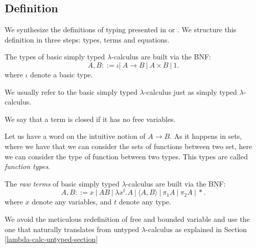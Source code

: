\subsection{Definition}

We synthesize the definitions of typing presented in \cite{lambek1988introduction} or \cite{selinger2008lecture}. We structure this definition in three steps: types, terms  and equations.


\begin{definition}
  The types of basic simply typed $\lambda$-calculus are built via the BNF:
  $$A,B ::= \iota |\ A\to B\ |\ A \times B  \ |\ 1.$$
  where $\iota$ denote a basic type. 
\end{definition}
\begin{remark}
  We usually refer to the basic simply typed $\lambda$-calculus just as simply typed $\lambda$-calculus.
\end{remark}
\begin{definition}
  We say that a term is closed if it has no free variables.
\end{definition}
\begin{remark}
Let us have a word on the intuitive notion of $A\to B$. As it happens in sets, where we have that we can consider the sets of functions between two set, here we can consider the type of function between two types. This types are called \emph{function types}.\\
\end{remark}








\begin{definition}
  The \emph{raw terms} of basic simply typed $\lambda$-calculus are built via the BNF:
  $$A,B ::= x\ |\ AB\ |\ \lambda x^t.A \ |\ \langle A,B \rangle\ |\ \pi_1A\ |\ \pi_2A\ |\ *.$$
  where $x$ denote any variables, and $t$ denote any type. 
\end{definition}

\begin{remark}
  We avoid the meticulous redefinition of free and bounded variable and use the one that naturally translates from untyped $\lambda$-calculus as explained in Section \ref{lambda-calc-untyped-section}
\end{remark}


